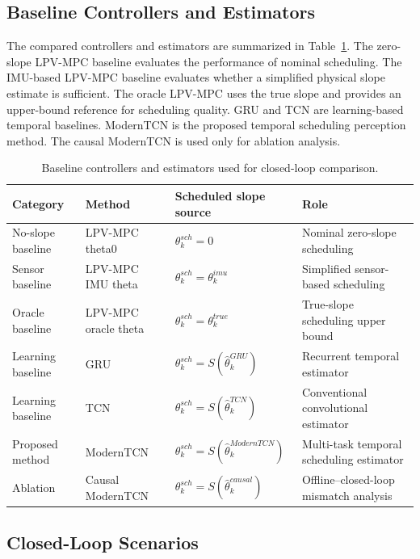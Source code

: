 \documentclass{ieeeaccess}
\begin{document}
\subsection{Baseline Controllers and Estimators}



The compared controllers and estimators are summarized in Table~\ref{tab:baseline_definitions}. The zero-slope LPV-MPC baseline evaluates the performance of nominal scheduling. The IMU-based LPV-MPC baseline evaluates whether a simplified physical slope estimate is sufficient. The oracle LPV-MPC uses the true slope and provides an upper-bound reference for scheduling quality. GRU and TCN are learning-based temporal baselines. ModernTCN is the proposed temporal scheduling perception method. The causal ModernTCN is used only for ablation analysis.



\begin{table}[!t]
\centering
\caption{Baseline controllers and estimators used for closed-loop comparison.}
\label{tab:baseline_definitions}
\footnotesize
\begin{tabular}{llll}
\hline
Category & Method & Scheduled slope source & Role \\
\hline
No-slope baseline & LPV-MPC theta0 & $\theta_k^{sch}=0$ & Nominal zero-slope scheduling \\
Sensor baseline & LPV-MPC IMU theta & $\theta_k^{sch}=\theta_k^{imu}$ & Simplified sensor-based scheduling \\
Oracle baseline & LPV-MPC oracle theta & $\theta_k^{sch}=\theta_k^{true}$ & True-slope scheduling upper bound \\
Learning baseline & GRU & $\theta_k^{sch}=S(\hat{\theta}_k^{GRU})$ & Recurrent temporal estimator \\
Learning baseline & TCN & $\theta_k^{sch}=S(\hat{\theta}_k^{TCN})$ & Conventional convolutional estimator \\
Proposed method & ModernTCN & $\theta_k^{sch}=S(\hat{\theta}_k^{ModernTCN})$ & Multi-task temporal scheduling estimator \\
Ablation & Causal ModernTCN & $\theta_k^{sch}=S(\hat{\theta}_k^{causal})$ & Offline--closed-loop mismatch analysis \\
\hline
\end{tabular}
\end{table}
\FloatBarrier

\subsection{Closed-Loop Scenarios}
\end{document}
